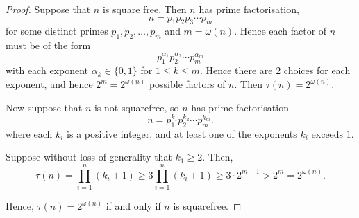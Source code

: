 \documentclass{unswmaths}
\begin{document}
\begin{proof}
    Suppose that $n$ is square free. Then $n$ has prime factorisation,
    \begin{equation*}
        n = p_1p_2p_3\cdots p_m
    \end{equation*}
    for some distinct primes $p_1,p_2,\ldots,p_m$ and $m = \omega(n)$. Hence each factor of $n$ must be of
    the form
    \begin{equation*}
        p_1^{\alpha_1}p_2^{\alpha_2}\cdots p_m^{\alpha_m}
    \end{equation*}
    with each exponent $\alpha_k \in \{0,1\}$ for $1\leq k \leq m$. Hence there
    are $2$ choices for each exponent, and hence $2^m = 2^{\omega(n)}$ possible
    factors of $n$. Then $\tau(n) = 2^{\omega(n)}$.
    
    Now suppose that $n$ is not squarefree, so $n$ has prime factorisation
    \begin{equation*}
        n = p_1^{k_1}p_2^{k_2}\cdots p_m^{k_m}.
    \end{equation*}
    where each $k_i$ is a positive integer, and at least one of the exponents $k_i$ exceeds $1$. 
    
    Suppose without loss of generality that $k_1 \geq 2$. Then,
    \begin{equation*}
        \tau(n) = \prod_{i=1}^n (k_i+1) \geq 3\prod_{i=1}^n (k_i+1) \geq 3\cdot 2^{m-1} > 2^m = 2^{\omega(n)}.
    \end{equation*}
    
    Hence, $\tau(n) = 2^{\omega(n)}$ if and only if $n$ is squarefree.
    
\end{proof} 
\end{document}
